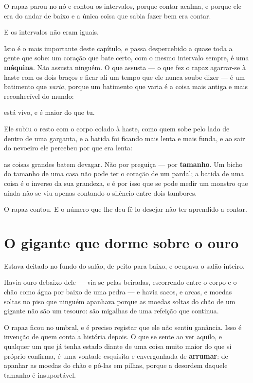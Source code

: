 \documentclass[livro.tex]{subfiles}
\begin{document}
O rapaz parou no nó e contou os intervalos, porque contar acalma, e porque ele era do
andar de baixo e a única coisa que sabia fazer bem era contar.

E os intervalos não eram iguais.

\medskip

Isto é o mais importante deste capítulo, e passa despercebido a quase toda a gente que
sobe: um coração que bate certo, com o mesmo intervalo sempre, é uma \textbf{máquina}. Não
assusta ninguém. O que assusta --- o que fez o rapaz agarrar-se à haste com os dois braços
e ficar ali um tempo que ele nunca soube dizer --- é um batimento que \emph{varia}, porque
um batimento que varia é a coisa mais antiga e mais reconhecível do mundo:

está vivo, e é maior do que tu.

\medskip

Ele subiu o resto com o corpo colado à haste, como quem sobe pelo lado de dentro de uma
garganta, e a batida foi ficando mais lenta e mais funda, e ao sair do nevoeiro ele
percebeu por que era lenta:

as coisas grandes batem devagar. Não por preguiça --- por \textbf{tamanho}. Um bicho do
tamanho de uma casa não pode ter o coração de um pardal; a batida de uma coisa é o inverso
da sua grandeza, e é por isso que se pode medir um monstro que ainda não se viu apenas
contando o silêncio entre dois tambores.

O rapaz contou. E o número que lhe deu fê-lo desejar não ter aprendido a contar.

\chapter{O gigante que dorme sobre o ouro}

Estava deitado no fundo do salão, de peito para baixo, e ocupava o salão inteiro.

Havia ouro debaixo dele --- via-se pelas beiradas, escorrendo entre o corpo e o chão como
água por baixo de uma pedra --- e havia sacos, e arcas, e moedas soltas no piso que
ninguém apanhava porque as moedas soltas do chão de um gigante não são um tesouro: são
migalhas de uma refeição que continua.

O rapaz ficou no umbral, e é preciso registar que ele não sentiu ganância. Isso é invenção
de quem conta a história depois. O que se sente ao ver aquilo, e qualquer um que já tenha
estado diante de uma coisa muito maior do que si próprio confirma, é uma vontade
esquisita e envergonhada de \textbf{arrumar}: de apanhar as moedas do chão e pô-las em
pilhas, porque a desordem daquele tamanho é insuportável.
\end{document}
